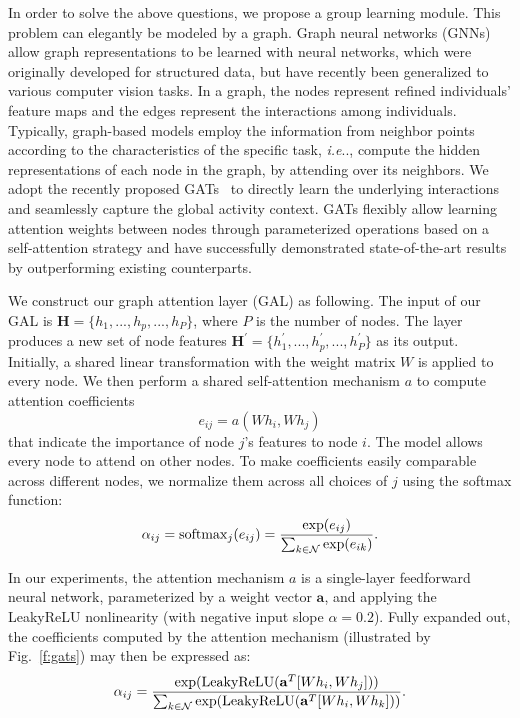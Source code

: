 \documentclass[10pt,journal,compsoc]{IEEEtran}
\makeatletter
\DeclareRobustCommand\onedot{\futurelet\@let@token\@onedot}
\def\@onedot{\ifx\@let@token.\else.\null\fi\xspace}
\def\ie{\emph{i.e}\onedot} \def\Ie{\emph{I.e}\onedot}
\makeatother
\begin{document}
In order to solve the above questions, we propose a group learning module. This problem can elegantly be modeled by a graph. Graph neural networks (GNNs)~\cite{Scarselli2008Graph} allow graph representations to be learned with neural networks, which were originally developed for structured data, but have recently been generalized to various computer vision tasks. In a graph, the nodes represent refined individuals' feature maps and the edges represent the interactions among individuals. Typically, graph-based models employ the information from neighbor points according to the characteristics of the specific task, \ie, compute the hidden representations of each node in the graph, by attending over its neighbors. We adopt the recently proposed GATs~\cite{Velivckovic2017Graph} to directly learn the underlying interactions and seamlessly capture the global activity context. GATs flexibly allow learning attention weights between nodes through parameterized operations based on a self-attention strategy and have successfully demonstrated state-of-the-art results by outperforming existing counterparts. 

We construct our graph attention layer (GAL) as following. The input of our GAL is $\mathbf{H} = \{h_1, ..., h_p, ..., h_P\}$, where $P$ is the number of nodes. The layer produces a new set of node features $\mathbf{H}^{\prime}  = \{h_1^{\prime}, ..., h_p^{\prime}, ..., h_P^{\prime}\}$ as its output. Initially, a shared linear transformation with the weight matrix $W$ is applied to every node. We then perform a shared self-attention mechanism $a$ to compute attention coefficients
\begin{equation}
  e_{ij} = a\left(Wh_i,Wh_j\right)
\end{equation}
that indicate the importance of node $j$'s features to node $i$. The model allows every node to attend on other nodes. To make coefficients easily comparable across different nodes, we normalize them across all choices of $j$ using the softmax function:
\begin{equation}
  \alpha_{ij} = {\rm softmax}_j(e_{ij}) = \frac{{\rm exp}(e_{ij})}{\sum_{k \in \mathcal{N}}{\rm exp}(e_{ik})}.
\end{equation}

In our experiments, the attention mechanism $a$ is a single-layer feedforward neural network, parameterized by a weight vector $\mathbf{a}$, and applying the LeakyReLU nonlinearity (with negative input slope $\alpha = 0.2$). Fully expanded out, the coefficients computed by the attention mechanism (illustrated by Fig.~\ref{f:gats}) may then be expressed as:
\begin{equation}
  \alpha_{ij} = \frac{{\rm exp}({\rm LeakyReLU}(\mathbf{a}^T[Wh_i,Wh_j]))}{\sum_{k \in \mathcal{N}}{\rm exp}({\rm LeakyReLU}(\mathbf{a}^T[Wh_i,Wh_k]))}.
\end{equation}
\end{document}
